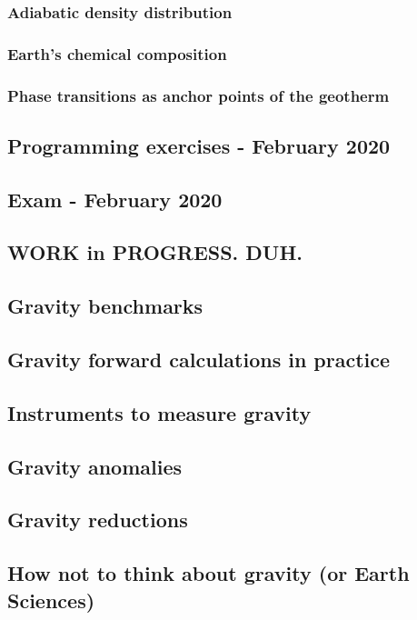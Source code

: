\subsubsection{Adiabatic density distribution} %
\label{Adiabatic density distribution}  %
\subsubsection{Earth's chemical composition} %
\label{section-chemical-composition}  %
\subsubsection{Phase transitions as anchor points of the geotherm} %
\label{section-anchor points}  %

\subsection{Programming exercises - February 2020} 
\subsection{Exam - February 2020} 

\newpage
\subsection{WORK in PROGRESS. DUH.} %

\subsection{Gravity benchmarks} 
\subsection{Gravity forward calculations in practice} 
\subsection{Instruments to measure gravity} 
\subsection{Gravity anomalies} 
\subsection{Gravity reductions} 
\subsection{How not to think about gravity (or Earth Sciences)} 
